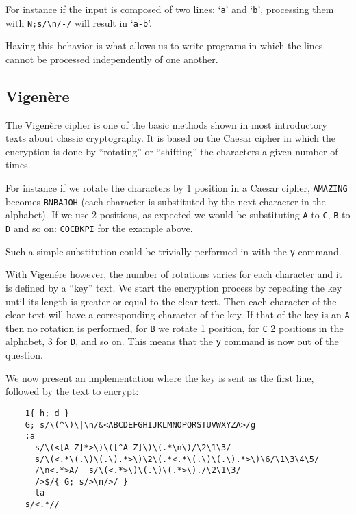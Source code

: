 For instance if the input is composed of two lines: `{\tt a}' and `{\tt b}',
processing them with \verb|N;s/\n/-/| will result in `{\tt a-b}'.

Having this behavior is what allows us to write programs in which the lines
cannot be processed independently of one another.

\subsection{Vigen\`ere}

The Vigen\`ere cipher is one of the basic methods shown in most introductory
texts about classic cryptography.  It is based on the Caesar cipher in which the
encryption is done by ``rotating'' or ``shifting'' the characters a given
number of times.

For instance if we rotate the characters by 1 position in a Caesar cipher,
{\tt AMAZING} becomes {\tt BNBAJOH} (each character is substituted by the
next character in the alphabet).  If we use 2 positions, as expected we would
be substituting {\tt A} to {\tt C}, {\tt B} to {\tt D} and so on:
{\tt COCBKPI} for the example above.

Such a simple substitution could be trivially performed in \sed* with the
{\tt y} command.

With Vigen\'ere however, the number of rotations varies for each character and
it is defined by a ``key'' text.  We start the encryption process by repeating
the key until its length is greater or equal to the clear text.  Then each
character of the clear text will have a corresponding character of the key.
If that of the key is an {\tt A} then no rotation is performed,
for {\tt B} we rotate 1 position, for {\tt C} 2 positions in the alphabet,
3 for {\tt D}, and so on.  This means that the {\tt y} command is now out of
the question.

We now present an implementation where the key is sent as the first line,
followed by the text to encrypt:

\begin{Verbatim}
	1{ h; d }
	G; s/\(^\)\|\n/&<ABCDEFGHIJKLMNOPQRSTUVWXYZA>/g
	:a
	  s/\(<[A-Z]*>\)\([^A-Z]\)\(.*\n\)/\2\1\3/
	  s/\(<.*\(.\)\(.\).*>\)\2\(.*<.*\(.\)\(.\).*>\)\6/\1\3\4\5/
	  /\n<.*>A/  s/\(<.*>\)\(.\)\(.*>\)./\2\1\3/
	  />$/{ G; s/>\n/>/ }
	  ta
	s/<.*//
\end{Verbatim}

